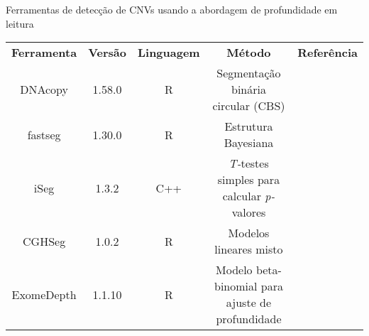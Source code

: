 
\begin{quadro}[h]
 \centering
 {\renewcommand\arraystretch{1.25}
 \caption{Ferramentas de detecção de CNVs usando a abordagem de profundidade em leitura\label{qua:ferramentas-de-deteccao-de-cnv}}
 \begin{adjustbox}{max width=\textwidth}
\begin{tabular}{ l l l l l }
  \cline{1-1}\cline{2-2}\cline{3-3}\cline{4-4}\cline{5-5}  
    \multicolumn{1}{|c|}{\textbf{\textcolor{color000000}{Ferramenta}}} &
    \multicolumn{1}{c|}{\textbf{\textcolor{color000000}{Versão}}} &
    \multicolumn{1}{c|}{\textbf{\textcolor{color000000}{Linguagem}}} &
    \multicolumn{1}{c|}{\textbf{\textcolor{color000000}{Método}}} &
    \multicolumn{1}{c|}{\textbf{Referência}}
  \\  
  \cline{1-1}\cline{2-2}\cline{3-3}\cline{4-4}\cline{5-5}  
    \multicolumn{1}{|c|}{DNAcopy} &
    \multicolumn{1}{c|}{1.58.0} &
    \multicolumn{1}{c|}{R} &
    \multicolumn{1}{c|}{Segmentação binária circular (CBS)} &
    \multicolumn{1}{c|}{\cite{Olshen2004}}
  \\  
  \cline{1-1}\cline{2-2}\cline{3-3}\cline{4-4}\cline{5-5}  
    \multicolumn{1}{|c|}{fastseg} &
    \multicolumn{1}{c|}{1.30.0} &
    \multicolumn{1}{c|}{R} &
    \multicolumn{1}{c|}{Estrutura Bayesiana} &
    \multicolumn{1}{c|}{\cite{Baldi2001}}
  \\  
  \cline{1-1}\cline{2-2}\cline{3-3}\cline{4-4}\cline{5-5}  
    \multicolumn{1}{|c|}{iSeg} &
    \multicolumn{1}{c|}{1.3.2} &
    \multicolumn{1}{c|}{C++} &
    \multicolumn{1}{c|}{\textit{T-}testes simples para calcular \textit{p-}valores} &
    \multicolumn{1}{c|}{\cite{Girimurugan2018}}
  \\  
  \cline{1-1}\cline{2-2}\cline{3-3}\cline{4-4}\cline{5-5}  
    \multicolumn{1}{|c|}{CGHSeg} &
    \multicolumn{1}{c|}{1.0.2} &
    \multicolumn{1}{c|}{R} &
    \multicolumn{1}{c|}{Modelos lineares misto} &
    \multicolumn{1}{c|}{\cite{Picard2011}}
  \\
  \cline{1-1}\cline{2-2}\cline{3-3}\cline{4-4}\cline{5-5}  
    \multicolumn{1}{|c|}{ExomeDepth} &
    \multicolumn{1}{c|}{1.1.10} &
    \multicolumn{1}{c|}{R} &
    \multicolumn{1}{c|}{Modelo beta-binomial para ajuste de profundidade} &
    \multicolumn{1}{c|}{\cite{Plagnol2012}}
  \\ 
  \hline

 \end{tabular}
 \end{adjustbox}}
\end{quadro}